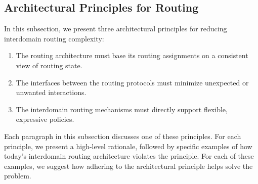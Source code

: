 

\subsection{Architectural Principles for Routing}\label{sec:principles}



In this subsection, we present three architectural principles for
reducing interdomain routing complexity:

\begin{enumerate}
\itemsep=-1pt
\item The routing architecture must base its routing assignments
on a consistent view of routing state. 
\item The interfaces between the routing protocols must minimize
unexpected or unwanted interactions.
\item The interdomain routing mechanisms must
directly support flexible, expressive policies.
\end{enumerate}
Each paragraph in this subsection discusses one of these principles.
For each principle, we present a high-level rationale, followed
by specific examples of how today's interdomain routing architecture
violates the principle.  For each of these examples, we suggest how
adhering to the architectural principle helps solve the problem.


